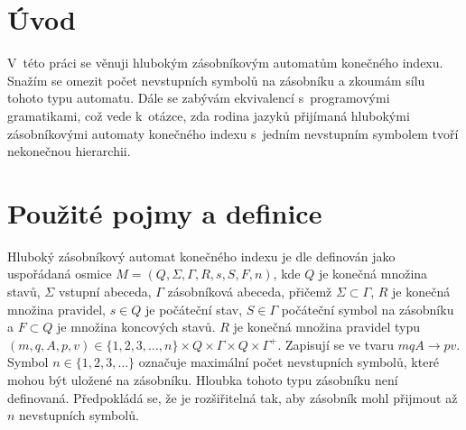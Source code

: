 

\chapter{Úvod}

V~této práci se věnuji hlubokým zásobníkovým automatům konečného indexu. Snažím se omezit počet nevstupních symbolů na zásobníku a zkoumám sílu tohoto typu automatu.
Dále se zabývám ekvivalencí s~programovými gramatikami, což vede k~otázce, zda rodina jazyků přijímaná hlubokými zásobníkovými automaty konečného indexu s~jedním nevstupním 
symbolem tvoří nekonečnou hierarchii. 






\chapter{Použité pojmy a definice}

\begin{Def} Hluboký zásobníkový automat konečného indexu je dle \cite{Meduna:DeepPDA} definován jako uspořádaná osmice $M = (Q,\Sigma,\Gamma, R, s, S, F, n)$, 
kde $Q$ je konečná množina stavů, $\Sigma$ vstupní abeceda, $\Gamma$ zásobníková abeceda, přičemž $\Sigma \subset \Gamma$,
$R$ je konečná množina pravidel, $s \in Q$ je počáteční stav, $S \in \Gamma$ počáteční symbol na zásobníku a $F \subset Q$ je množina
koncových stavů. $R$ je konečná množina pravidel typu $(m, q, A, p, v) \in \{1,2,3,\dots,n\} \times Q \times \Gamma \times Q \times {\Gamma}^+$. Zapisují se ve tvaru $mqA \rightarrow pv$. Symbol $n \in \{1,2,3,\dots\}$ označuje maximální počet nevstupních symbolů, které mohou být uložené na zásobníku.
Hloubka tohoto typu zásobníku není definovaná. Předpokládá se, že je rozšiřitelná tak, aby zásobník mohl přijmout až $n$ nevstupních symbolů.
\end{Def}


